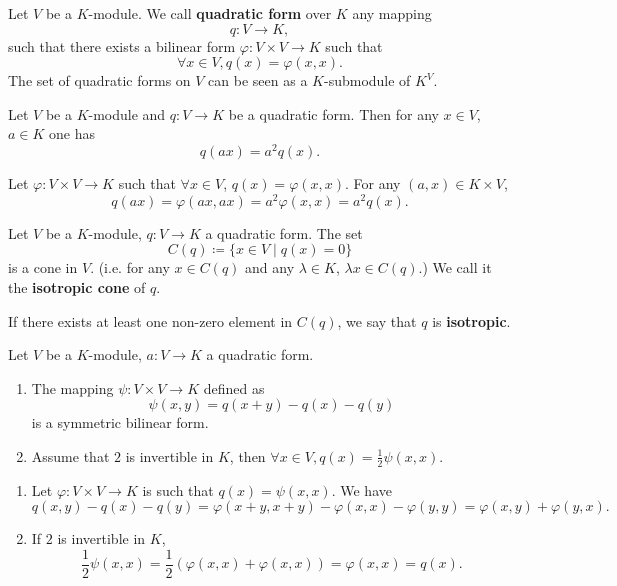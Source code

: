 \begin{definitionenv}
    Let $V$ be a $K$-module. We call \textbf{quadratic form} over $K$ any mapping
    $$ q : V\rightarrow K,$$
    such that there exists a bilinear form $\varphi:V\times V\rightarrow K$ such that
    $$ \forall x\in V, q(x) = \varphi(x,x).$$
    The set of quadratic forms on $V$ can be seen as a $K$-submodule of $K^{V}$.
\end{definitionenv}
\begin{propositionenv}
    Let $V$ be a $K$-module and $q:V\rightarrow K$ be a quadratic form. Then for any $x\in V$, $a\in K$ one has 
    $$q(ax) = a^2 q(x).$$
\end{propositionenv}
\begin{proofenv}
    Let $\varphi : V\times V\rightarrow K$ such that $\forall x\in V$, $q(x) = \varphi(x,x)$. For any $(a,x) \in K \times V$,
    $$ q(ax) = \varphi (ax,ax) = a^2 \varphi(x,x) = a^2 q(x).$$
\end{proofenv}
\begin{definitionenv}
    Let $V$ be a $K$-module, $q: V\rightarrow K$ a quadratic form. The set 
    $$ C(q) \coloneq \{x\in V\mid q(x) =0 \}$$
    is a cone in $V$. (i.e. for any $x\in C(q)$ and any $\lambda \in K$, $\lambda x \in C(q)$.)
    We call it the \textbf{isotropic cone} of $q$.
    
    \quad If there exists at least one non-zero element in $C(q)$, we say that $q$ is \textbf{isotropic}.
\end{definitionenv}
\begin{propositionenv}\label{2.3.4}
    Let $V$ be a $K$-module, $a:V\rightarrow K$ a quadratic form.
    \begin{enumerate}
        \item The mapping $\psi: V\times V\rightarrow K$ defined as
        $$\psi (x,y) = q(x+y) -q(x) -q(y)$$
        is a symmetric bilinear form.
        \item Assume that $2$ is invertible in $K$, then 
        $ \forall x\in V, q(x) = \frac{1}{2} \psi(x,x).$
    \end{enumerate}
\end{propositionenv}
\begin{proofenv}
    \quad
    \begin{enumerate}
        \item Let $\varphi : V\times V\rightarrow K$ is such that $q(x) = \psi (x,x)$. We have 
        $$ q(x,y) -q(x) -q(y) = \varphi (x+y,x+y) - \varphi (x,x) - \varphi(y,y) = \varphi(x,y) + \varphi(y,x).$$
        \item If $2$ is invertible in $K$, 
        $$ \frac{1}{2} \psi(x,x) = \frac{1}{2} \left(\varphi (x,x) + \varphi(x,x)\right) = \varphi(x,x) = q(x).$$
    \end{enumerate}
\end{proofenv}
